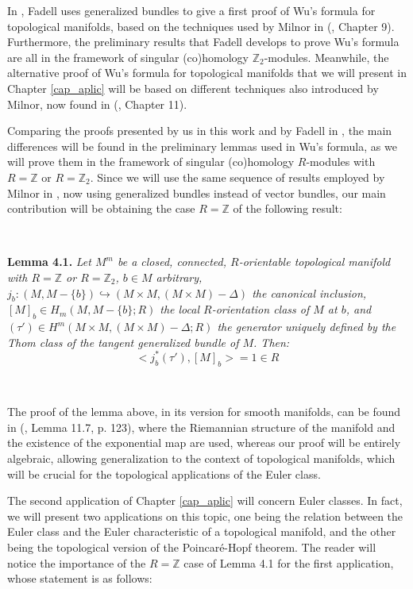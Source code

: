 \documentclass[12pt,oneside]{book}
\newcommand{\Z}{\mathbb{Z}}
\begin{document}
    In \cite{fadell_1}, Fadell uses generalized bundles to give a first proof of Wu's formula for 
    topological manifolds, based on the techniques used by Milnor in (\cite{milnor_2}, Chapter 9). 
    Furthermore, the preliminary results that Fadell develops to prove Wu's formula are all in the 
    framework of singular (co)homology $\Z_{2}$-modules. Meanwhile, the alternative proof of Wu's 
    formula for topological manifolds that we will present in Chapter \ref{cap_aplic} will be based on 
    different techniques also introduced by Milnor, now found in (\cite{milnor_1}, Chapter 11).

    Comparing the proofs presented by us in this work and by Fadell in \cite{fadell_1}, the main 
    differences will be found in the preliminary lemmas used in Wu's formula, as we will prove them in 
    the framework of singular (co)homology $R$-modules with $R=\Z$ or $R=\Z_{2}$. Since we will use the 
    same sequence of results employed by Milnor in \cite{milnor_1}, now using generalized bundles 
    instead of vector bundles, our main contribution will be obtaining the case $R=\Z$ of the following 
    result:

    \

    \textbf{Lemma 4.1.} \textit{Let $M^{m}$ be a closed, connected, $R$-orientable topological manifold 
    with $R=\Z$ or $R=\Z_{2}$, $b\in M$ arbitrary, 
    $j_{b}:(M,M-\{b\})\hookrightarrow (M\times M,(M\times M)-\Delta)$ the canonical inclusion, 
    $[M]_{b}\in H_{m}(M,M-\{b\};R)$ the local $R$-orientation class of $M$ at $b$, and 
    $(\tau')\in H^{m}(M\times M,(M\times M)-\Delta;R)$ the generator uniquely defined by the Thom class 
    of the tangent generalized bundle of $M$. Then:
        $$ <j_{b}^{*}(\tau'),[M]_{b}>=1\in R $$}
    
    \

    The proof of the lemma above, in its version for smooth manifolds, can be found in (\cite{milnor_1}, 
    Lemma 11.7, p. 123), where the Riemannian structure of the manifold and the existence of the 
    exponential map are used, whereas our proof will be entirely algebraic, allowing generalization to 
    the context of topological manifolds, which will be crucial for the topological applications of the 
    Euler class.

    The second application of Chapter \ref{cap_aplic} will concern Euler classes. In fact, we will 
    present two applications on this topic, one being the relation between the Euler class and the Euler 
    characteristic of a topological manifold, and the other being the topological version of the 
    Poincaré-Hopf theorem. The reader will notice the importance of the $R=\Z$ case of Lemma 4.1 for the 
    first application, whose statement is as follows:
\end{document}
